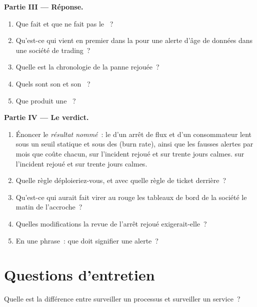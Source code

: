 \begin{problem}
\medskip\noindent\textbf{Partie III --- Réponse.}
\begin{enumerate}[resume]
\item Que fait et que ne fait pas le ~?
\item Qu'est-ce qui vient en premier dans la  pour une alerte d'âge de données dans une société de trading~?
\item Quelle est la chronologie de la panne rejouée~?
\item Quels sont son  et son ~?
\item Que produit une ~?
\end{enumerate}

\medskip\noindent\textbf{Partie IV --- Le verdict.}
\begin{enumerate}[resume]
\item Énoncer le \emph{résultat nommé}~: le  d'un arrêt de flux et d'un consommateur lent sous un seuil statique et sous des  (burn rate), ainsi que les fausses alertes par mois que coûte chacun, sur l'incident rejoué et sur trente jours calmes.
sur l'incident rejoué et sur trente jours calmes.
\item Quelle règle déploieriez-vous, et avec quelle règle de ticket derrière~?
\item Qu'est-ce qui aurait fait virer au rouge les tableaux de bord de la société le matin de l'accroche~?
\item Quelles modifications la revue de l'arrêt rejoué exigerait-elle~?
\item En une phrase~: que doit signifier une alerte~?
\end{enumerate}
\end{problem}

\section{Questions d'entretien}

\begin{interviewq}\label{iq:pl:observability-and-incident-response:1}
Quelle est la différence entre surveiller un processus et surveiller un service~?
\end{interviewq}

